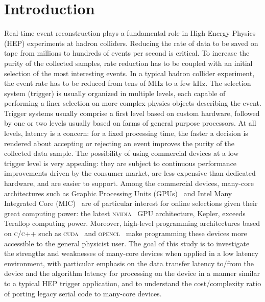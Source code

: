\documentclass[a4]{jpconf}
\begin{document}
\section{Introduction}
Real-time event reconstruction plays a fundamental role in High Energy
Physics (HEP) experiments at hadron colliders.  Reducing the rate of
data to be saved on tape from millions to hundreds of events per
second is critical. To increase the purity of the collected samples,
rate reduction has to be coupled with an initial selection of the most
interesting events.  In a typical hadron collider experiment, the
event rate has to be reduced from tens of MHz to a few kHz.  The
selection system (trigger) is usually organized in multiple levels,
each capable of performing a finer selection on more complex physics
objects describing the event. Trigger systems usually comprise a first
level based on custom hardware, followed by one or two levels usually
based on farms of general purpose processors.  At all levels, latency
is a concern: for a fixed processing time, the faster a decision is
rendered about accepting or rejecting an event improves the purity of
the collected data sample. The possibility of using commercial devices
at a low trigger level is very appealing: they are subject to
continuous performance improvements driven by the consumer market, are
less expensive than dedicated hardware, and are easier to support.
Among the commercial devices, many-core architectures such as Graphic
Processing Units (GPUs)~\cite{bib_gpu} and Intel Many Integrated Core
(MIC)~\cite{bib_intelMIC} are of particular interest for online
selections given their great computing power: the latest
\textsc{nvidia}~\cite{bib_nvidia} GPU architecture, Kepler, exceeds
Teraflop computing power. Moreover, high-level programming
architectures based on \textsc{c/c++} such as
\textsc{cuda}~\cite{bib_cuda} and \textsc{opencl}~\cite{bib_opencl}
make programming these devices more accessible to the general
physicist user.  The goal of this study is to investigate the
strengths and weaknesses of many-core devices when applied in a low
latency environment, with particular emphasis on the data transfer
latency to/from the device and the algorithm latency for processing on
the device in a manner similar to a typical HEP trigger application,
and to understand the cost/complexity ratio of porting legacy serial
code to many-core devices.
\end{document}
